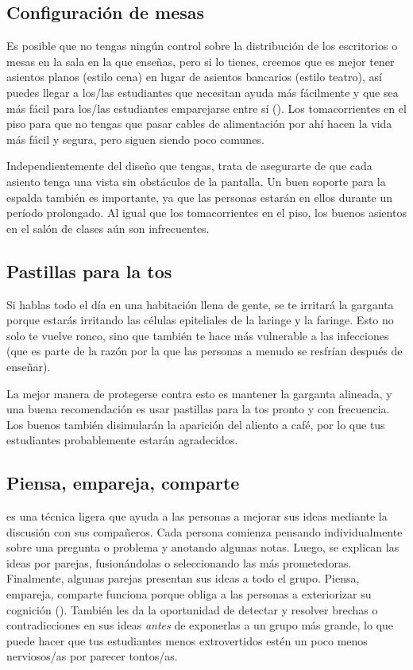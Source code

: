 \subsection*{Configuración de mesas}

Es posible que no tengas ningún control sobre la distribución de los escritorios o mesas
en la sala en la que enseñas,
pero si lo tienes,
creemos que es mejor tener asientos planos (estilo cena)
en lugar de asientos bancarios (estilo teatro),
así puedes llegar a los/las estudiantes que necesitan ayuda más fácilmente
y que sea más fácil para los/las estudiantes emparejarse entre sí ().
Los tomacorrientes en el piso para que no tengas que pasar cables de alimentación por ahí
hacen la vida más fácil y segura,
pero siguen siendo poco comunes.

Independientemente del diseño que tengas,
trata de asegurarte de que cada asiento tenga una vista sin obstáculos de la pantalla.
Un buen soporte para la espalda también es importante,
ya que las personas estarán en ellos durante un período prolongado.
Al igual que los tomacorrientes en el piso,
los buenos asientos en el salón de clases aún son infrecuentes.

\subsection*{Pastillas para la tos}

Si hablas todo el día en una habitación llena de gente,
se te irritará la garganta porque estarás irritando las células epiteliales de la laringe y la faringe.
Esto no solo te vuelve ronco, sino que también te hace más vulnerable a las infecciones
(que es parte de la razón por la que las personas a menudo se resfrían después de enseñar).

La mejor manera de protegerse contra esto es mantener la garganta alineada,
y una buena recomendación es usar pastillas para la tos pronto y con frecuencia.
Los buenos también disimularán la aparición del aliento a café,
por lo que tus estudiantes probablemente estarán agradecidos.

\subsection*{Piensa, empareja, comparte}

 es una técnica ligera
que ayuda a las personas a mejorar sus ideas
mediante la discusión con sus compañeros.
Cada persona comienza pensando individualmente sobre una pregunta o problema
y anotando algunas notas.
Luego, se explican las ideas por parejas,
fusionándolas o seleccionando las más prometedoras.
Finalmente,
algunas parejas presentan sus ideas a todo el grupo.
Piensa, empareja, comparte funciona porque obliga a las personas a exteriorizar su cognición
().
También les da la oportunidad de detectar y resolver brechas o contradicciones en sus ideas
\emph{antes} de exponerlas a un grupo más grande,
lo que puede hacer que tus estudiantes menos extrovertidos estén un poco menos nerviosos/as
por parecer tontos/as.

